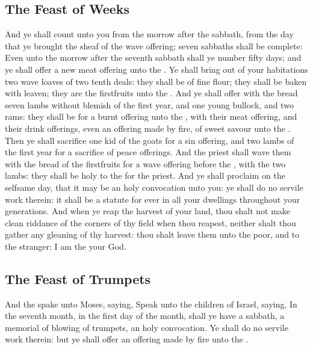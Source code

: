 \begin{biblechapter}
\subsection*{The Feast of Weeks}
\verse And ye shall count unto you from the morrow after the sabbath, from the day that ye brought the sheaf of the wave offering; seven sabbaths shall be complete:
\verse Even unto the morrow after the seventh sabbath shall ye number fifty days; and ye shall offer a new meat offering unto the \LORD.
\verse Ye shall bring out of your habitations two wave loaves of two tenth deals: they shall be of fine flour; they shall be baken with leaven; they are the firstfruits unto the \LORD.
\verse And ye shall offer with the bread seven lambs without blemish of the first year, and one young bullock, and two rams: they shall be for a burnt offering unto the \LORD, with their meat offering, and their drink offerings, even an offering made by fire, of sweet savour unto the \LORD.
\verse Then ye shall sacrifice one kid of the goats for a sin offering, and two lambs of the first year for a sacrifice of peace offerings.
\verse And the priest shall wave them with the bread of the firstfruits for a wave offering before the \LORD, with the two lambs: they shall be holy to the \LORD for the priest.
\verse And ye shall proclaim on the selfsame day, that it may be an holy convocation unto you: ye shall do no servile work therein: it shall be a statute for ever in all your dwellings throughout your generations.
\verse And when ye reap the harvest of your land, thou shalt not make clean riddance of the corners of thy field when thou reapest, neither shalt thou gather any gleaning of thy harvest: thou shalt leave them unto the poor, and to the stranger: I am the \LORD your God.
\subsection*{The Feast of Trumpets}
\verse And the \LORD spake unto Moses, saying,
\verse Speak unto the children of Israel, saying, In the seventh month, in the first day of the month, shall ye have a sabbath, a memorial of blowing of trumpets, an holy convocation.
\verse Ye shall do no servile work therein: but ye shall offer an offering made by fire unto the \LORD.

\end{biblechapter}
